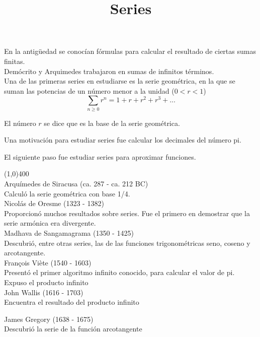 \documentclass[a4paper, 11pt]{article}
\title{Series}
\author{}
\date{}
\begin{document}
\maketitle


En la antigüedad se conocían fórmulas para calcular el resultado de ciertas sumas finitas.\\

Demócrito y Arquimedes trabajaron en sumas de infinitos términos.\\


Una de las primeras series en estudiarse es la serie geométrica, en la que se suman las potencias de un número menor a la unidad ($0 < r < 1$)
$$\sum_{n \geq 0} r^n = 1 + r + r^2 + r^3 + ...$$



El número $r$ se dice que es la base de la serie geométrica.


Una motivación para estudiar series fue calcular los decimales del número pi. 

El siguiente paso fue estudiar series para aproximar funciones.

\line(1,0){400}\\

Arquímedes de Siracusa (ca. 287 - ca. 212 BC)\\
Calculó la serie geométrica con base 1/4.\\

Nicolás de Oresme (1323 - 1382)\\
Proporcionó muchos resultados sobre series.
Fue el primero en demostrar que la serie armónica era divergente.\\

Madhava de Sangamagrama (1350 - 1425)\\
Descubrió, entre otras series, las de las funciones trigonométricas seno, coseno y arcotangente.\\

François Viète (1540 - 1603)\\
Presentó el primer algoritmo infinito conocido, para calcular el valor de pi. Expuso el producto infinito\\



John Wallis (1616 - 1703)\\
Encuentra el resultado del producto infinito



James Gregory (1638 - 1675)\\
Descubrió la serie de la función arcotangente\\
\end{document}
